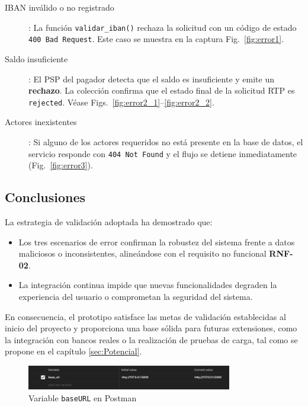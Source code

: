 \begin{description}
  \item[IBAN inválido o no registrado]: La función \texttt{validar\_iban()} rechaza la solicitud con un código de estado \texttt{400 Bad Request}. Este caso se muestra en la captura Fig.~\ref{fig:error1}.
  
  \item[Saldo insuficiente]: El PSP del pagador detecta que el saldo es insuficiente y emite un \textbf{rechazo}. La colección confirma que el estado final de la solicitud RTP es \texttt{rejected}. Véase Figs.~\ref{fig:error2_1}–\ref{fig:error2_2}.
  
  \item[Actores inexistentes]: Si alguno de los actores requeridos no está presente en la base de datos, el servicio responde con \texttt{404 Not Found} y el flujo se detiene inmediatamente (Fig.~\ref{fig:error3}).
\end{description}

\subsection{Conclusiones}

La estrategia de validación adoptada ha demostrado que:

\begin{itemize}
  \item Los tres escenarios de error confirman la robustez del sistema frente a datos maliciosos o inconsistentes, alineándose con el requisito no funcional \textbf{RNF-02}.
  \item La integración continua impide que nuevas funcionalidades degraden la experiencia del usuario o comprometan la seguridad del sistema.
\end{itemize}

En consecuencia, el prototipo satisface las metas de validación establecidas al inicio del proyecto y proporciona una base sólida para futuras extensiones, como la integración con bancos reales o la realización de pruebas de carga, tal como se propone en el capítulo \ref{sec:Potencial}.



\begin{figure}[H]
  \centering
  \includegraphics[width=0.8\textwidth]{Imagenes/baseURL.png}
  \caption{Variable \texttt{baseURL} en Postman}
  \label{fig:baseURL}
\end{figure}


